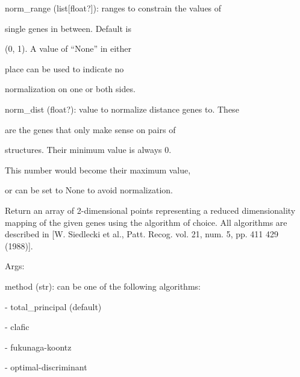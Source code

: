 \documentclass[letterpaper,10pt,english]{sphinxmanual}
\begin{document}
\begin{fulllineitems}
\begin{DUlineblock}{0em}
\begin{DUlineblock}{\DUlineblockindent}
\begin{DUlineblock}{\DUlineblockindent}
\end{DUlineblock}
\item[] norm\_range (list{[}float?{]}): ranges to constrain the values of
\item[]
\begin{DUlineblock}{\DUlineblockindent}
\item[] single genes in between. Default is
\item[] (0, 1). A value of ``None'' in either
\item[] place can be used to indicate no
\item[] normalization on one or both sides.
\end{DUlineblock}
\item[] norm\_dist (float?): value to normalize distance genes to. These
\item[]
\begin{DUlineblock}{\DUlineblockindent}
\item[] are the genes that only make sense on pairs of
\item[] structures. Their minimum value is always 0.
\item[] This number would become their maximum value,
\item[] or can be set to None to avoid normalization.
\end{DUlineblock}
\end{DUlineblock}
\end{DUlineblock}

\begin{fulllineitems}
\label{doctree/soprano.analyse.phylogen.phylogenclust:soprano.analyse.phylogen.phylogenclust.PhylogenCluster.create_mapping}
Return an array of 2-dimensional points representing a reduced
dimensionality mapping of the given genes using the algorithm of
choice. All algorithms are described in {[}W. Siedlecki et al., Patt.
Recog. vol. 21, num. 5, pp. 411 429 (1988){]}.

\begin{DUlineblock}{0em}
\item[] Args:
\item[]
\begin{DUlineblock}{\DUlineblockindent}
\item[] method (str): can be one of the following algorithms:
\item[]
\begin{DUlineblock}{\DUlineblockindent}
\item[] - total\_principal (default)
\item[] - clafic
\item[] - fukunaga-koontz
\item[] - optimal-discriminant
\end{DUlineblock}
\end{DUlineblock}
\end{DUlineblock}


\end{fulllineitems}
\end{fulllineitems}
\end{document}
